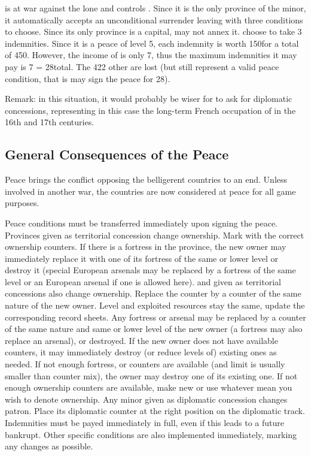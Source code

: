 \begin{exemple}
  \FRA is at war against the lone \paysLorraine and controls
  \provinceLorraine. Since it is the only province of the minor, it
  automatically accepts an unconditional surrender leaving \FRA with three
  conditions to choose. Since its only province is a capital, \FRA may not
  annex it. \FRA choose to take 3 indemnities. Since it is a peace of level 5,
  each indemnity is worth 150\ducats for a total of 450\ducats. However, the
  income of \paysLorraine is only 7\ducats, thus the maximum indemnities it
  may pay is 7  = 28\ducats total. The 422 other \ducats are
  lost (but still represent a valid peace condition, that is \FRA may sign the
  peace for 28\ducats).

  Remark: in this situation, it would probably be wiser for \FRA to ask for
  diplomatic concessions, representing in this case the long-term French
  occupation of \paysLorraine in the 16th and 17th centuries.
\end{exemple}

\subsection{General Consequences of the Peace}
\aparag Peace brings the conflict opposing the belligerent countries to an
end.
\bparag Unless involved in another war, the countries are now considered at
peace for all game purposes.

 Peace conditions must be transferred immediately
upon signing the peace.
\bparag Provinces given as territorial concession change ownership. Mark with
the correct ownership counters. If there is a fortress in the province, the
new owner may immediately replace it with one of its fortress of the same or
lower level or destroy it (special European arsenals may be replaced by a
fortress of the same level or an European arsenal if one is allowed here).
\bparag \COL and \TP given as territorial concessions also change
ownership. Replace the counter by a counter of the same nature of the new
owner. Level and exploited resources stay the same, update the corresponding
record sheets. Any fortress or arsenal may be replaced by a counter of the
same nature and same or lower level of the new owner (a fortress may also
replace an arsenal), or destroyed.
\bparag If the new owner does not have available counters, it may immediately
destroy (or reduce levels of) existing ones as needed.
\bparag If not enough fortress, \COL or \TP counters are available (\COL and
\TP limit is usually smaller than counter mix), the owner may destroy one of
its existing one. If not enough ownership counters are available, make new or
use whatever mean you wish to denote ownership.
\bparag Any minor given as diplomatic concession changes patron. Place its
diplomatic counter at the right position on the diplomatic track.
\bparag Indemnities must be payed immediately in full, even if this leads to a
future bankrupt.
\bparag Other specific conditions are also implemented immediately, marking
any changes as possible.

